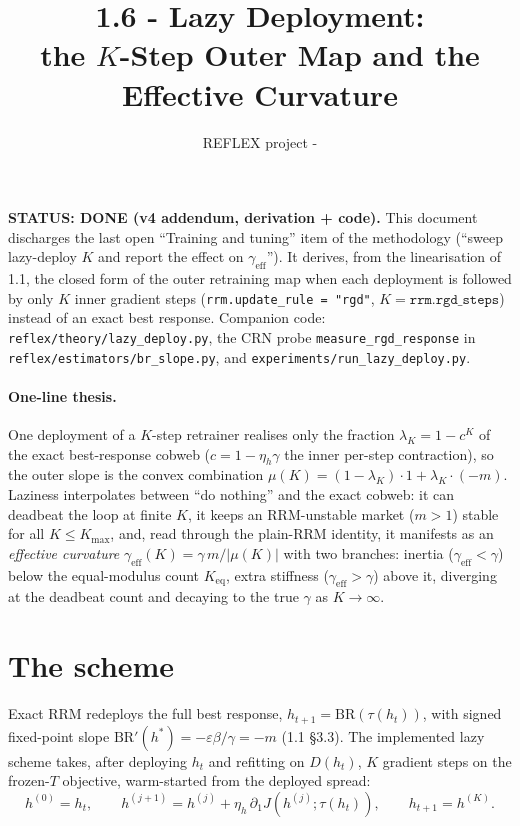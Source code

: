 \documentclass[11pt]{article}
\title{\textbf{1.6 - Lazy Deployment:\\ the $K$-Step Outer Map and the Effective Curvature}}
\author{REFLEX project - \code{math-theory}}
\date{}
\newcommand{\eps}{\varepsilon}
\newcommand{\code}[1]{\texttt{#1}}
\newcommand{\BR}{\mathrm{BR}}
\newcommand{\geff}{\gamma_{\mathrm{eff}}}
\begin{document}
\maketitle

\noindent\textbf{STATUS: DONE (v4 addendum, derivation + code).} This document
discharges the last open ``Training and tuning'' item of the methodology
(``sweep lazy-deploy $K$ and report the effect on $\geff$''). It derives, from
the linearisation of 1.1, the closed form of the outer retraining map when each
deployment is followed by only $K$ inner gradient steps
(\code{rrm.update\_rule = "rgd"}, $K = \code{rrm.rgd\_steps}$) instead of an
exact best response. Companion code: \code{reflex/theory/lazy\_deploy.py}, the
CRN probe \code{measure\_rgd\_response} in
\code{reflex/estimators/br\_slope.py}, and
\code{experiments/run\_lazy\_deploy.py}.

\paragraph{One-line thesis.}
One deployment of a $K$-step retrainer realises only the fraction
$\lambda_K = 1 - c^K$ of the exact best-response cobweb ($c = 1-\eta_h\gamma$
the inner per-step contraction), so the outer slope is the convex combination
$\mu(K) = (1-\lambda_K)\cdot 1 + \lambda_K\cdot(-m)$. Laziness interpolates
between ``do nothing'' and the exact cobweb: it can deadbeat the loop at finite
$K$, it keeps an RRM-unstable market ($m>1$) stable for all $K \le K_{\max}$,
and, read through the plain-RRM identity, it manifests as an \emph{effective
curvature} $\geff(K) = \gamma\, m/|\mu(K)|$ with two branches: inertia
($\geff < \gamma$) below the equal-modulus count $K_{\mathrm{eq}}$, extra
stiffness ($\geff > \gamma$) above it, diverging at the deadbeat count and
decaying to the true $\gamma$ as $K \to \infty$.

\section{The scheme}

Exact RRM redeploys the full best response, $h_{t+1} = \BR(\tau(h_t))$, with
signed fixed-point slope $\BR'(h^*) = -\eps\beta/\gamma = -m$ (1.1 \S3.3). The
implemented lazy scheme takes, after deploying $h_t$ and refitting on
$D(h_t)$, $K$ gradient steps on the frozen-$T$ objective, warm-started from the
deployed spread:
\[
  h^{(0)} = h_t, \qquad
  h^{(j+1)} = h^{(j)} + \eta_h\, \partial_1 J\!\left(h^{(j)};\tau(h_t)\right),
  \qquad h_{t+1} = h^{(K)} .
\]
\end{document}
